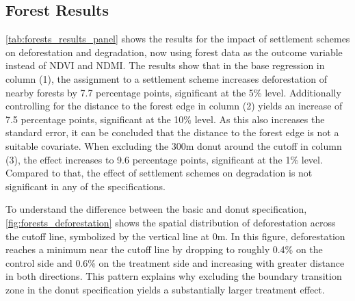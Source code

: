 \subsection{Forest Results}
\label{subsec:results_forests}


\begin{customltable}
    \caption{Main Results for Forest Impact (Deforestation and Degradation)}
    \label{tab:forests_results_panel}
    \setlength{\tabcolsep}{10pt}
    \small

\end{customltable}

\cref{tab:forests_results_panel} shows the results for the impact of settlement schemes on deforestation and degradation, now using forest data as the outcome variable instead of NDVI and NDMI.
The results show that in the base regression in column (1), the assignment to a settlement scheme increases deforestation of nearby forests by 7.7 percentage points, significant at the 5\% level.
Additionally controlling for the distance to the forest edge in column (2) yields an increase of 7.5 percentage points, significant at the 10\% level.
As this also increases the standard error, it can be concluded that the distance to the forest edge is not a suitable covariate.
When excluding the 300m donut around the cutoff in column (3), the effect increases to 9.6 percentage points, significant at the 1\% level.
Compared to that, the effect of settlement schemes on degradation is not significant in any of the specifications.

To understand the difference between the basic and donut specification, \cref{fig:forests_deforestation} shows the spatial distribution of deforestation across the cutoff line, symbolized by the vertical line at 0m.
In this figure, deforestation reaches a minimum near the cutoff line by dropping to roughly 0.4\% on the control side and 0.6\% on the treatment side and increasing with greater distance in both directions.
This pattern explains why excluding the boundary transition zone in the donut specification yields a substantially larger treatment effect.

